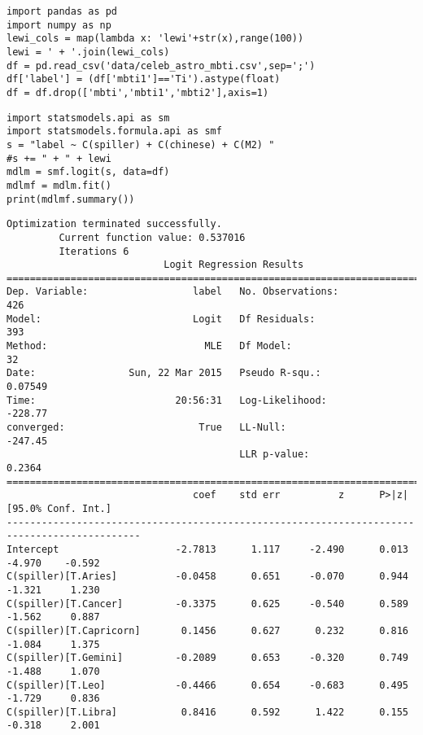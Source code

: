 \documentclass[12pt,fleqn]{article}\usepackage{../common}
\begin{document}
\begin{verbatim}
import pandas as pd
import numpy as np
lewi_cols = map(lambda x: 'lewi'+str(x),range(100))
lewi = ' + '.join(lewi_cols)
df = pd.read_csv('data/celeb_astro_mbti.csv',sep=';')
df['label'] = (df['mbti1']=='Ti').astype(float)
df = df.drop(['mbti','mbti1','mbti2'],axis=1)
\end{verbatim}


\begin{verbatim}
import statsmodels.api as sm
import statsmodels.formula.api as smf
s = "label ~ C(spiller) + C(chinese) + C(M2) "
#s += " + " + lewi
mdlm = smf.logit(s, data=df)
mdlmf = mdlm.fit()
print(mdlmf.summary())
\end{verbatim}

\begin{verbatim}
Optimization terminated successfully.
         Current function value: 0.537016
         Iterations 6
                           Logit Regression Results                           
==============================================================================
Dep. Variable:                  label   No. Observations:                  426
Model:                          Logit   Df Residuals:                      393
Method:                           MLE   Df Model:                           32
Date:                Sun, 22 Mar 2015   Pseudo R-squ.:                 0.07549
Time:                        20:56:31   Log-Likelihood:                -228.77
converged:                       True   LL-Null:                       -247.45
                                        LLR p-value:                    0.2364
=============================================================================================
                                coef    std err          z      P>|z|      [95.0% Conf. Int.]
---------------------------------------------------------------------------------------------
Intercept                    -2.7813      1.117     -2.490      0.013        -4.970    -0.592
C(spiller)[T.Aries]          -0.0458      0.651     -0.070      0.944        -1.321     1.230
C(spiller)[T.Cancer]         -0.3375      0.625     -0.540      0.589        -1.562     0.887
C(spiller)[T.Capricorn]       0.1456      0.627      0.232      0.816        -1.084     1.375
C(spiller)[T.Gemini]         -0.2089      0.653     -0.320      0.749        -1.488     1.070
C(spiller)[T.Leo]            -0.4466      0.654     -0.683      0.495        -1.729     0.836
C(spiller)[T.Libra]           0.8416      0.592      1.422      0.155        -0.318     2.001

\end{verbatim}
\end{document}
